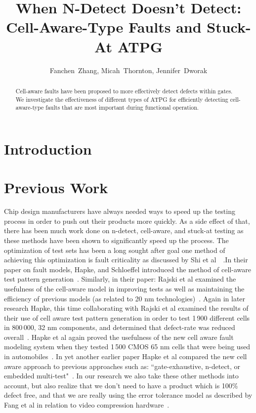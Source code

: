 \documentclass[10 pt, technote]{IEEEtran}
\title{When N-Detect Doesn't Detect: Cell-Aware-Type Faults and Stuck-At ATPG}
\author{Fanchen~Zhang, Micah~Thornton, Jennifer~Dworak}
\begin{document}
\twocolumn[
  \begin{@twocolumnfalse}
    \maketitle
  \end{@twocolumnfalse}
]

\begin{abstract}

Cell-aware faults have been proposed to more effectively detect defects within gates.  We investigate the effectiveness of different types of ATPG for efficiently detecting cell-aware-type faults that are most important during functional operation.

\end{abstract}

\tableofcontents

\section{Introduction}

\section{Previous Work}

	Chip design manufacturers have always needed ways to speed up the testing process in order to push out their products more quickly. As a side effect of that, there has been much work done on n-detect, cell-aware, and stuck-at testing as these methods have been shown to significantly speed up the process. The optimization of test sets has been a long sought after goal one method of achieving this optimization is fault criticality as discussed by Shi et al~\cite{4641197}~\cite{5469545}.In their paper on fault models, Hapke, and Schloeffel introduced the method of cell-aware test pattern generation~\cite{6233046}. Similarly, in their paper: Rajski et al examined the usefulness of the cell-aware model in improving tests as well as maintaining the efficiency of previous models (as related to 20 nm technologies)~\cite{6673230}. Again in later research Hapke, this time collaborating with Rajski et al examined the results of their use of cell aware test pattern generation in order to test 1\,900 different cells in 800\,000, 32 nm components, and determined that defect-rate was reduced overall~\cite{6401533}. Hapke et al again proved the usefulness of the new cell aware fault modeling system when they tested 1\,500 CMOS 65 nm cells that were being used in automobiles~\cite{5783604}. In yet another earlier paper Hapke et al compared the new cell aware approach to previous approaches such as: ``gate-exhaustive, n-detect, or embedded multi-test"~\cite{5355741}. In our research we also take these other methods into account, but also realize that we don't need to have a product which is 100\% defect free, and that we are really using the error tolerance model as described by Fang et al in relation to video compression hardware~\cite{6114751}. 
	
\end{document}
